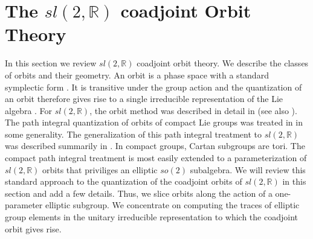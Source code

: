 \documentclass[12pt]{article}
\numberwithin{equation}{section}
\numberwithin{equation}{section}
\numberwithin{table}{section}\setlength{\multlinegap}{25pt}
\begin{document}
\section{\texorpdfstring{The $sl(2,\mathbb{R})$ coadjoint Orbit Theory}{The sl(2,R) Coadjoint Orbit Theory}}
\label{EllipticQuantization}
\label{Elliptic}
In this section we review $sl(2,\mathbb{R})$ coadjoint orbit theory. We describe the classes of orbits and their geometry. An orbit is a phase space with a standard symplectic form \cite{Kirillov}. It is transitive under the group action and the quantization of an orbit therefore gives rise to a single irreducible representation of the Lie algebra \cite{Kirillov}. For $sl(2,\mathbb{R})$, the orbit method was  described in  detail in \cite{Vergne}  (see also \cite{Witten:1987ty}). The path integral quantization of orbits of compact Lie groups was treated in \cite{Alekseev:1988vx} in some generality. The generalization of this path integral treatment to $sl(2,\mathbb{R})$ was described summarily in  \cite{Troost:2003ge,Troost:2012ck}. In compact groups, Cartan subgroups are tori. The compact path integral treatment is most easily extended to a parameterization of $sl(2,\mathbb{R})$ orbits that priviliges an elliptic $so(2)$ subalgebra. We will review this standard approach to the quantization of  the coadjoint orbits of $sl(2,\mathbb{R})$ in this section and add a few details. Thus, we slice orbits along the action of a one-parameter elliptic subgroup.  We  concentrate on computing the traces of elliptic group elements in the unitary irreducible representation to which the coadjoint orbit gives rise. 
\end{document}
